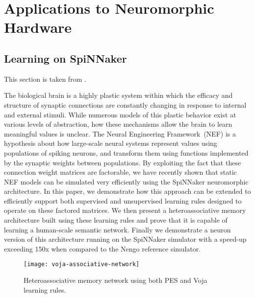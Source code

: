 \chapter{Applications to Neuromorphic Hardware}
\label{chapt:results}

\section{Learning on SpiNNaker}

This section is taken from \citep{knight2016}.

The biological brain is a highly plastic system within which the efficacy and structure of synaptic connections are constantly changing in response to internal and external stimuli.
While numerous models of this plastic behavior exist at various levels of abstraction, how these mechanisms allow the brain to learn meaningful values is unclear.
The Neural Engineering Framework~(NEF) is a hypothesis about how large-scale neural systems represent values using populations of spiking neurons, and transform them using functions implemented by the synaptic weights between populations.
By exploiting the fact that these connection weight matrices are factorable, we have recently shown that static NEF models can be simulated very efficiently using the SpiNNaker neuromorphic architecture.
In this paper, we demonstrate how this approach can be extended to efficiently support both supervised and unsupervised learning rules designed to operate on these factored matrices.
We then present a heteroassociative memory architecture built using these learning rules and prove that it is capable of learning a human-scale semantic network.
Finally we demonstrate a  neuron version of this architecture running on the SpiNNaker simulator with a speed-up exceeding 150x when compared to the Nengo reference simulator.

\begin{figure}
  \centering
  \texttt{[image: voja-associative-network]}
  \caption{Heteroassociative memory network using both PES and Voja learning rules.}
  \label{fig:voja-associative-network}
\end{figure}

